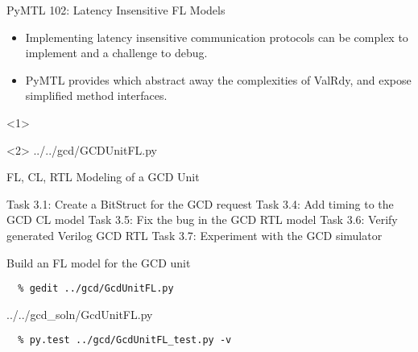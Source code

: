 \begin{frame}{PyMTL 102: Latency Insensitive FL Models}
\begin{itemize}
  \item Implementing latency insensitive communication protocols can be
        complex to implement and a challenge to debug.
  \smallskip
  \item PyMTL provides  which abstract away the
        complexities of ValRdy, and expose simplified method interfaces.
\end{itemize}

  \begin{onlyenv}<1>
  \end{onlyenv}

  \begin{onlyenv}<2>
  \vspace{-0.15in}
  {../../gcd/GCDUnitFL.py}
  \end{onlyenv}

\end{frame}


\begin{frame}{ FL, CL, RTL Modeling of a GCD Unit}
\begin{cbxlist}
  \1 Task 3.1: Create a BitStruct for the GCD request
  \1 
  \1 
  \1 Task 3.4: Add timing to the GCD CL model
  \1 Task 3.5: Fix the bug in the GCD RTL model
  \1 Task 3.6: Verify generated Verilog GCD RTL
  \1 Task 3.7: Experiment with the GCD simulator
\end{cbxlist}
\end{frame}

\begin{task}\begin{frame}[fragile]{Build an FL model for the GCD unit}
\vspace{-0.2in}
\begin{Verbatim}[commandchars=\\\{\}]
  % cd    \midtilde/pymtl-tut/build
  % gedit ../gcd/GcdUnitFL.py
\end{Verbatim}

%
{../../gcd_soln/GcdUnitFL.py}

\begin{verbatim}
  % py.test ../gcd/GcdUnitFL_test.py -v
\end{verbatim}
\end{frame}
\end{task}

